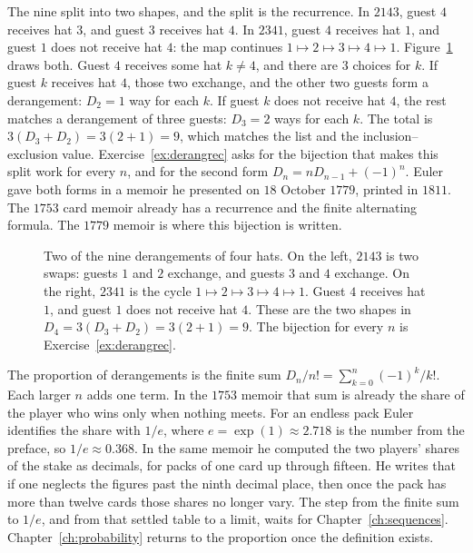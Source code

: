 The nine split into two shapes, and the split is the recurrence. In $2143$, guest $4$ receives hat $3$, and guest $3$ receives hat $4$. In $2341$, guest $4$ receives hat $1$, and guest $1$ does not receive hat $4$: the map continues $1\mapsto 2\mapsto 3\mapsto 4\mapsto 1$. Figure~\ref{fig:splice} draws both. Guest $4$ receives some hat $k\neq 4$, and there are $3$ choices for $k$. If guest $k$ receives hat $4$, those two exchange, and the other two guests form a derangement: $D_2=1$ way for each $k$. If guest $k$ does not receive hat $4$, the rest matches a derangement of three guests: $D_3=2$ ways for each $k$. The total is $3(D_3+D_2)=3(2+1)=9$, which matches the list and the inclusion--exclusion value. Exercise~\ref{ex:derangrec} asks for the bijection that makes this split work for every $n$, and for the second form $D_n=nD_{n-1}+(-1)^n$. Euler gave both forms in a memoir he presented on $18$ October $1779$, printed in $1811$. The $1753$ card memoir already has a recurrence and the finite alternating formula. The $1779$ memoir is where this bijection is written.

\begin{figure}[ht]
\centering
{}
\caption{Two of the nine derangements of four hats. On the left, $2143$ is two swaps: guests $1$ and $2$ exchange, and guests $3$ and $4$ exchange. On the right, $2341$ is the cycle $1\mapsto 2\mapsto 3\mapsto 4\mapsto 1$. Guest $4$ receives hat $1$, and guest $1$ does not receive hat $4$. These are the two shapes in $D_4=3(D_3+D_2)=3(2+1)=9$. The bijection for every $n$ is Exercise~\ref{ex:derangrec}.}
\label{fig:splice}
\end{figure}

The proportion of derangements is the finite sum $D_n/n!=\sum_{k=0}^n(-1)^k/k!$. Each larger $n$ adds one term. In the $1753$ memoir that sum is already the share of the player who wins only when nothing meets. For an endless pack Euler identifies the share with $1/e$, where $e=\exp(1)\approx 2.718$ is the number from the preface, so $1/e\approx 0.368$. In the same memoir he computed the two players' shares of the stake as decimals, for packs of one card up through fifteen. He writes that if one neglects the figures past the ninth decimal place, then once the pack has more than twelve cards those shares no longer vary. The step from the finite sum to $1/e$, and from that settled table to a limit, waits for Chapter~\ref{ch:sequences}. Chapter~\ref{ch:probability} returns to the proportion once the definition exists.

